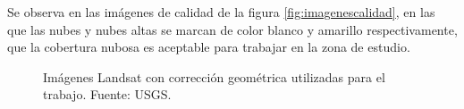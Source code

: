Se observa en las imágenes de calidad de la figura \ref{fig:imagenescalidad}, en las que las nubes y nubes altas se marcan de color blanco y amarillo respectivamente, que la cobertura nubosa es aceptable para trabajar en la zona de estudio.\Sep

\begin{figure}
	\centering
	\caption[Imágenes Landsat]{Imágenes Landsat con corrección geométrica utilizadas para el trabajo. Fuente: USGS.}
	\label{fig:imagenesLandsat}
\end{figure}

